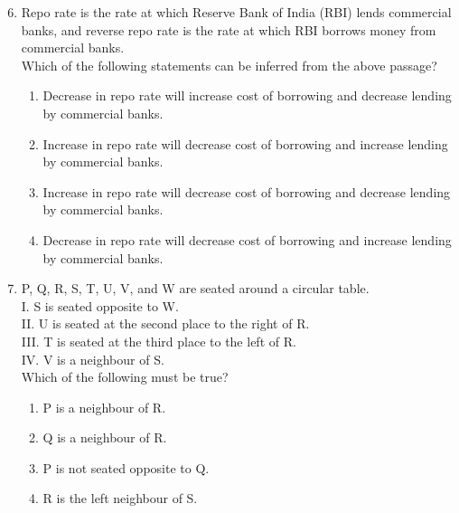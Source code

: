 \documentclass[journal,12pt,onecolumn]{IEEEtran}
\begin{document}
\begin{enumerate}[label=\arabic*.]
\setcounter{enumi}{5}

\item Repo rate is the rate at which Reserve Bank of India (RBI) lends commercial banks, and reverse repo rate is the rate at which RBI borrows money from commercial banks.\\

Which of the following statements can be inferred from the above passage?
\begin{enumerate}[label=(\Alph*)]
    \item Decrease in repo rate will increase cost of borrowing and decrease lending by commercial banks.
    \item Increase in repo rate will decrease cost of borrowing and increase lending by commercial banks.
    \item Increase in repo rate will decrease cost of borrowing and decrease lending by commercial banks.
    \item Decrease in repo rate will decrease cost of borrowing and increase lending by commercial banks.
\end{enumerate}

\item P, Q, R, S, T, U, V, and W are seated around a circular table.\\
I. S is seated opposite to W.\\
II. U is seated at the second place to the right of R.\\
III. T is seated at the third place to the left of R.\\
IV. V is a neighbour of S.\\

Which of the following must be true?
\begin{multicols}{2}
\begin{enumerate}[label=(\Alph*)]
    \item P is a neighbour of R.
    \item Q is a neighbour of R.
    \item P is not seated opposite to Q.
    \item R is the left neighbour of S.
\end{enumerate}
\end{multicols}


\end{enumerate}
\end{document}
